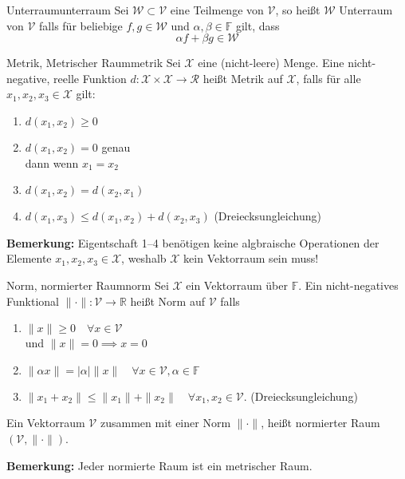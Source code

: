 \begin{boringDef}{Unterraum}{unterraum}
  Sei $\mathcal{W} \subset \mathcal{V}$ eine Teilmenge von $\mathcal{V}$, so heißt $\mathcal{W}$ Unterraum von $\mathcal{V}$ falls für beliebige $f, g \in \mathcal{W}$ und $\alpha, \beta \in \mathbb{F}$ gilt, dass
  \begin{equation*}
    \alpha f + \beta g \in \mathcal{W}
  \end{equation*}
\end{boringDef}


\begin{boringDef}{Metrik, Metrischer Raum}{metrik}
  Sei $\mathcal{X}$ eine (nicht-leere) Menge.
  Eine nicht-negative, reelle Funktion $d:\mathcal{X}\times\mathcal{X} \to \mathcal{R}$ heißt Metrik auf $\mathcal{X}$, falls für alle $x_{1},x_{2},x_{3} \in \mathcal{X}$ gilt:
  \begin{enumerate}
          \item $d(x_{1}, x_{2}) \geq 0$
          \item $d(x_{1}, x_{2}) = 0$ genau\\ dann wenn $x_{1} = x_{2}$
          \item $d(x_{1}, x_{2}) = d(x_{2}, x_{1})$
          \item $d(x_{1}, x_{3}) \leq d(x_{1}, x_{2}) + d(x_{2}, x_{3})$ (Dreiecksungleichung)
  \end{enumerate}
  \textbf{Bemerkung:} Eigentschaft 1--4 benötigen keine algbraische Operationen der Elemente $x_{1},x_{2},x_{3} \in \mathcal{X}$, weshalb $\mathcal{X}$ kein Vektorraum sein muss!
\end{boringDef}


\begin{boringDef}{Norm, normierter Raum}{norm}
  Sei $\mathcal{X}$ ein Vektorraum über $\mathbb{F}$. Ein nicht-negatives Funktional $\|\cdot\| : \mathcal{V} \to \mathbb{R}$ heißt Norm auf $\mathcal{V}$ falls
  \begin{enumerate}
    \item $\|x\| \geq 0 \quad \forall x \in \mathcal{V}$\\ und $\|x\| = 0 \implies x = 0$
    \item $\|\alpha x\| = |\alpha| \| x\| \quad \forall x \in \mathcal{V}, \alpha \in \mathbb{F}$
    \item $\|x_{1} + x_{2}\| \leq \|x_{1}\| + \|x_{2}\| \quad \forall x_{1},x_{2} \in \mathcal{V}$. (Dreiecksungleichung)
  \end{enumerate}
  Ein Vektorraum $\mathcal{V}$ zusammen mit einer Norm $\|\cdot\|$, heißt normierter Raum $(\mathcal{V}, \|\cdot\|)$.

  \textbf{Bemerkung:} Jeder normierte Raum ist ein metrischer Raum.
\end{boringDef}

